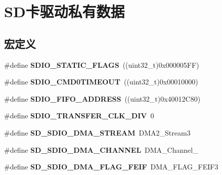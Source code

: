 \hypertarget{group__sd__card__private}{}\section{S\+D卡驱动私有数据}
\label{group__sd__card__private}
\subsection*{宏定义}
\begin{DoxyCompactItemize}
\item 
\#define {\bfseries S\+D\+I\+O\+\_\+\+S\+T\+A\+T\+I\+C\+\_\+\+F\+L\+A\+GS}~((uint32\+\_\+t)0x000005\+F\+F)\hypertarget{group__sd__card__private_gab07b969cd21592c74e8ad5d929e97055}{}\label{group__sd__card__private_gab07b969cd21592c74e8ad5d929e97055}

\item 
\#define {\bfseries S\+D\+I\+O\+\_\+\+C\+M\+D0\+T\+I\+M\+E\+O\+UT}~((uint32\+\_\+t)0x00010000)\hypertarget{group__sd__card__private_ga451e336c7bc16567a28475fcb75c9828}{}\label{group__sd__card__private_ga451e336c7bc16567a28475fcb75c9828}

\item 
\#define {\bfseries S\+D\+I\+O\+\_\+\+F\+I\+F\+O\+\_\+\+A\+D\+D\+R\+E\+SS}~((uint32\+\_\+t)0x40012\+C80)\hypertarget{group__sd__card__private_ga50b379bbcb59f027be37e9e787d3aa94}{}\label{group__sd__card__private_ga50b379bbcb59f027be37e9e787d3aa94}

\item 
\#define {\bfseries S\+D\+I\+O\+\_\+\+T\+R\+A\+N\+S\+F\+E\+R\+\_\+\+C\+L\+K\+\_\+\+D\+IV}~0\hypertarget{group__sd__card__private_gad37fe2cf88496122b5fdf14ae7f529b5}{}\label{group__sd__card__private_gad37fe2cf88496122b5fdf14ae7f529b5}

\item 
\#define {\bfseries S\+D\+\_\+\+S\+D\+I\+O\+\_\+\+D\+M\+A\+\_\+\+S\+T\+R\+E\+AM}~D\+M\+A2\+\_\+\+Stream3\hypertarget{group__sd__card__private_ga144c171660990547b329e9cc8d80cfcd}{}\label{group__sd__card__private_ga144c171660990547b329e9cc8d80cfcd}

\item 
\#define {\bfseries S\+D\+\_\+\+S\+D\+I\+O\+\_\+\+D\+M\+A\+\_\+\+C\+H\+A\+N\+N\+EL}~D\+M\+A\+\_\+\+Channel\+\_\hypertarget{group__sd__card__private_ga6f2bf8fb56b3b16c624945f5143f7c61}{}\label{group__sd__card__private_ga6f2bf8fb56b3b16c624945f5143f7c61}

\item 
\#define {\bfseries S\+D\+\_\+\+S\+D\+I\+O\+\_\+\+D\+M\+A\+\_\+\+F\+L\+A\+G\+\_\+\+F\+E\+IF}~D\+M\+A\+\_\+\+F\+L\+A\+G\+\_\+\+F\+E\+I\+F3\hypertarget{group__sd__card__private_ga48a2a089882dbc382f2cc4dc59a81439}{}\label{group__sd__card__private_ga48a2a089882dbc382f2cc4dc59a81439}


\end{DoxyCompactItemize}
